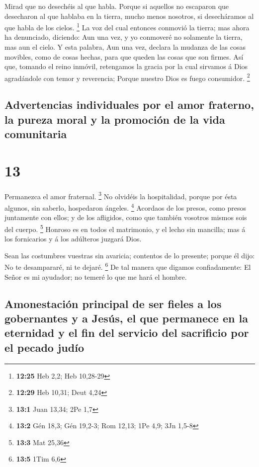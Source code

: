  Mirad que no desechéis al que habla. Porque si aquellos no
escaparon que desecharon al que hablaba en la tierra, mucho menos
nosotros, si desecháramos al que habla de los cielos. \footnote{\textbf{12:25}
  Heb 2,2; Heb 10,28-29}  La voz del cual entonces conmovió
la tierra; mas ahora ha denunciado, diciendo: Aun una vez, y yo
conmoveré no solamente la tierra, mas aun el cielo.  Y esta
palabra, Aun una vez, declara la mudanza de las cosas movibles, como de
cosas hechas, para que queden las cosas que son firmes. 
Así que, tomando el reino inmóvil, retengamos la gracia por la cual
sirvamos á Dios agradándole con temor y reverencia;  Porque
nuestro Dios es fuego consumidor. \footnote{\textbf{12:29} Heb 10,31;
  Deut 4,24}

\hypertarget{advertencias-individuales-por-el-amor-fraterno-la-pureza-moral-y-la-promociuxf3n-de-la-vida-comunitaria}{%
\subsection{Advertencias individuales por el amor fraterno, la pureza
moral y la promoción de la vida
comunitaria}\label{advertencias-individuales-por-el-amor-fraterno-la-pureza-moral-y-la-promociuxf3n-de-la-vida-comunitaria}}

\hypertarget{section-12}{%
\section{13}\label{section-12}}

 Permanezca el amor fraternal. \footnote{\textbf{13:1} Juan
  13,34; 2Pe 1,7}  No olvidéis la hospitalidad, porque por
ésta algunos, sin saberlo, hospedaron ángeles. \footnote{\textbf{13:2}
  Gén 18,3; Gén 19,2-3; Rom 12,13; 1Pe 4,9; 3Jn 1,5-8} 
Acordaos de los presos, como presos juntamente con ellos; y de los
afligidos, como que también vosotros mismos sois del cuerpo. \footnote{\textbf{13:3}
  Mat 25,36}  Honroso es en todos el matrimonio, y el lecho
sin mancilla; mas á los fornicarios y á los adúlteros juzgará Dios.

 Sean las costumbres vuestras sin avaricia; contentos de lo
presente; porque él dijo: No te desampararé, ni te dejaré. \footnote{\textbf{13:5}
  1Tim 6,6}  De tal manera que digamos confiadamente: El
Señor es mi ayudador; no temeré lo que me hará el hombre.

\hypertarget{amonestaciuxf3n-principal-de-ser-fieles-a-los-gobernantes-y-a-jesuxfas-el-que-permanece-en-la-eternidad-y-el-fin-del-servicio-del-sacrificio-por-el-pecado-juduxedo}{%
\subsection{Amonestación principal de ser fieles a los gobernantes y a
Jesús, el que permanece en la eternidad y el fin del servicio del
sacrificio por el pecado
judío}\label{amonestaciuxf3n-principal-de-ser-fieles-a-los-gobernantes-y-a-jesuxfas-el-que-permanece-en-la-eternidad-y-el-fin-del-servicio-del-sacrificio-por-el-pecado-juduxedo}}

